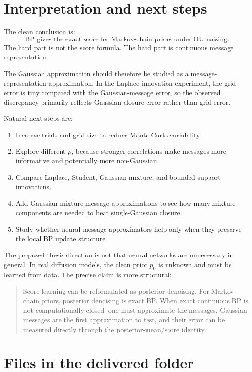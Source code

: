 \documentclass[11pt]{article}
\begin{document}
\section{Interpretation and next steps}
\label{sec:nextsteps}

The clean conclusion is:
\[
\boxed{\text{BP gives the exact score for Markov-chain priors under OU noising.}}
\]
The hard part is not the score formula. The hard part is continuous message representation.

The Gaussian approximation should therefore be studied as a message-representation approximation. In the Laplace-innovation experiment, the grid error is tiny compared with the Gaussian-message error, so the observed discrepancy primarily reflects Gaussian closure error rather than grid error.

Natural next steps are:
\begin{enumerate}[label=\arabic*.]
  \item Increase trials and grid size to reduce Monte Carlo variability.
  \item Explore different \(\rho\), because stronger correlations make messages more informative and potentially more non-Gaussian.
  \item Compare Laplace, Student, Gaussian-mixture, and bounded-support innovations.
  \item Add Gaussian-mixture message approximations to see how many mixture components are needed to beat single-Gaussian closure.
  \item Study whether neural message approximators help only when they preserve the local BP update structure.
\end{enumerate}

The proposed thesis direction is not that neural networks are unnecessary in general. In real diffusion models, the clean prior \(p_0\) is unknown and must be learned from data. The precise claim is more structural:
\begin{quote}
Score learning can be reformulated as posterior denoising. For Markov-chain priors, posterior denoising is exact BP. When exact continuous BP is not computationally closed, one must approximate the messages. Gaussian messages are the first approximation to test, and their error can be measured directly through the posterior-mean/score identity.
\end{quote}

\appendix
\section{Files in the delivered folder}
\end{document}
